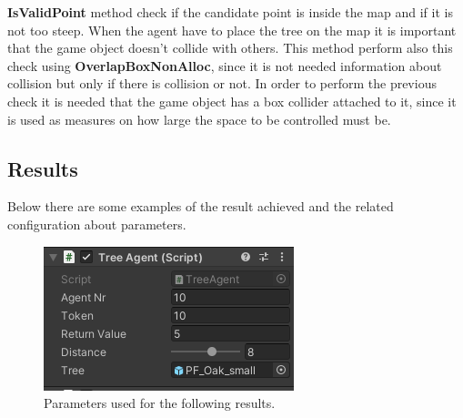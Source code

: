\documentclass[12pt]{article}
\begin{document}
    \textbf{IsValidPoint} method check if the candidate point is inside the map and if it is not too steep. When the agent have to place the tree on the map it is important that 
    the game object doesn't collide with others. This method perform also this check using \textbf{OverlapBoxNonAlloc}, since it is not needed information about collision but only
    if there is collision or not. In order to perform the previous check it is needed that the game object has a box collider attached to it, since it is used 
    as measures on how large the space to be controlled must be.

    \subsection{Results}
    Below there are some examples of the result achieved and the related configuration about parameters.

    \begin{figure}[H]
        \centering
        \includegraphics[scale = 0.8]{images/Tree agent/1/Parameters}
        \caption{Parameters used for the following results.}
    \end{figure}
\end{document}
